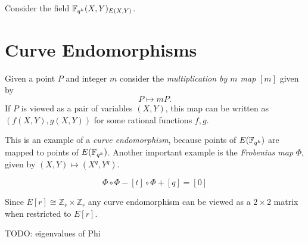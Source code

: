 Consider the field $\mathbb{F}_{q^k}(X,Y)_{E(X,Y)}$.

\section {Curve Endomorphisms}

Given a point $P$ and integer $m$ consider the \emph{multiplication by $m$ map}
$[m]$ given by \[ P \mapsto m P . \]
If $P$ is viewed as a pair of variables $(X,Y)$, this map
can be written as $(f(X,Y), g(X,Y))$ for some rational functions $f,g$.

This is an example of a \emph{curve endomorphism}, because points of
$E(\mathbb{F}_{q^k})$ are mapped to points of $E(\mathbb{F}_{q^k})$. Another important example
is the \emph{Frobenius map} $\Phi$, given by $(X, Y) \mapsto (X^q, Y^q)$.

\begin{theorem}
[Hasse]
\[ \Phi \circ \Phi - [t] \circ \Phi + [q] = [0] \]
\end{theorem}

Since $E[r] \cong \mathbb{Z}_r \times \mathbb{Z}_r$ any curve endomorphism
can be viewed as a $2\times2$ matrix when restricted to $E[r]$.

TODO: eigenvalues of Phi
